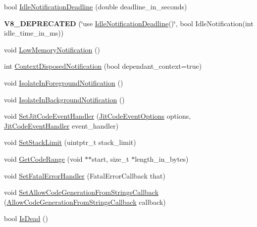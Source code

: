 \begin{DoxyCompactItemize}
\item 
bool \hyperlink{classv8_1_1_isolate_aba794ed25d4fa8780b3a07c66a5e5d4a}{Idle\+Notification\+Deadline} (double deadline\+\_\+in\+\_\+seconds)
\item 
{\bfseries V8\+\_\+\+D\+E\+P\+R\+E\+C\+A\+T\+ED} (\char`\"{}use \hyperlink{classv8_1_1_isolate_aba794ed25d4fa8780b3a07c66a5e5d4a}{Idle\+Notification\+Deadline}()\char`\"{}, bool Idle\+Notification(int idle\+\_\+time\+\_\+in\+\_\+ms))\hypertarget{classv8_1_1_isolate_a2f204e8d3ff66d940ddc58da5a202003}{}\label{classv8_1_1_isolate_a2f204e8d3ff66d940ddc58da5a202003}

\item 
void \hyperlink{classv8_1_1_isolate_aaf446f4877e4707a93d2c406fffd9fd6}{Low\+Memory\+Notification} ()
\item 
int \hyperlink{classv8_1_1_isolate_a4b5216bbb1792211422aee575d02f442}{Context\+Disposed\+Notification} (bool dependant\+\_\+context=true)
\item 
void \hyperlink{classv8_1_1_isolate_afaa09b3cb3a20f53bdcdce4b154d928f}{Isolate\+In\+Foreground\+Notification} ()
\item 
void \hyperlink{classv8_1_1_isolate_a15c1ba9cdb3526a6439e7fddb292ee93}{Isolate\+In\+Background\+Notification} ()
\item 
void \hyperlink{classv8_1_1_isolate_a71d976355bf47eb2dd09cd5d1279a40d}{Set\+Jit\+Code\+Event\+Handler} (\hyperlink{namespacev8_a06f34fa4fa4cfc8518366808d1d461c1}{Jit\+Code\+Event\+Options} options, \hyperlink{namespacev8_a39243bc91e63d64d111452fdb98c4733}{Jit\+Code\+Event\+Handler} event\+\_\+handler)
\item 
void \hyperlink{classv8_1_1_isolate_addbbe14af7efb92999ac3944bc9ffed5}{Set\+Stack\+Limit} (uintptr\+\_\+t stack\+\_\+limit)
\item 
void \hyperlink{classv8_1_1_isolate_a46c7fb2282970530c32740d7e5999b22}{Get\+Code\+Range} (void $\ast$$\ast$start, size\+\_\+t $\ast$length\+\_\+in\+\_\+bytes)
\item 
void \hyperlink{classv8_1_1_isolate_a131f1e2e6a80618ac3c8c266a041851d}{Set\+Fatal\+Error\+Handler} (Fatal\+Error\+Callback that)
\item 
void \hyperlink{classv8_1_1_isolate_ad91199faf0a599c69539af01f5df44e9}{Set\+Allow\+Code\+Generation\+From\+Strings\+Callback} (\hyperlink{namespacev8_a521d909ec201742a1cb35d50a8e2a3c2}{Allow\+Code\+Generation\+From\+Strings\+Callback} callback)
\item 
bool \hyperlink{classv8_1_1_isolate_a603a9bc7860d7936bce2dd45829869c3}{Is\+Dead} ()
$$
\end{DoxyCompactItemize}
